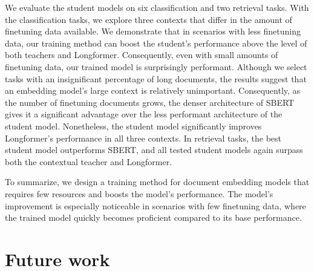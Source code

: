 We evaluate the student models on six classification and two retrieval tasks.
With the classification tasks, we explore three contexts that differ in the
amount of finetuning data available. We demonstrate that in scenarios with less
finetuning data, our training method can boost the student's performance above
the level of both teachers and Longformer. Consequently, even with small
amounts of finetuning data, our trained model is surprisingly performant.
Although we select tasks with an insignificant percentage of long documents,
the results suggest that an embedding model's large context is relatively
unimportant. Consequently, as the number of finetuning documents grows, the
denser architecture of SBERT gives it a significant advantage over the less
performant architecture of the student model. Nonetheless, the student model
significantly improves Longformer's performance in all three contexts. In
retrieval tasks, the best student model outperforms SBERT, and all tested
student models again surpass both the contextual teacher and Longformer.

To summarize, we design a training method for document embedding models that
requires few resources and boosts the model's performance. The model's
improvement is especially noticeable in scenarios with few finetuning data,
where the trained model quickly becomes proficient compared to its base
performance.


\section{Future work}

